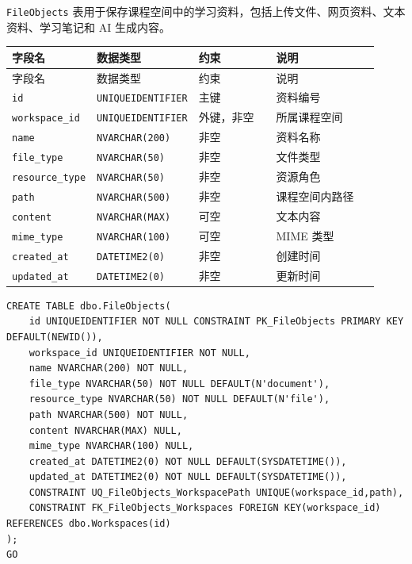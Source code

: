 \documentclass[10pt,a4paper,fontset=none]{ctexart}
\begin{document}
\texttt{FileObjects} 表用于保存课程空间中的学习资料，包括上传文件、网页资料、文本资料、学习笔记和 AI 生成内容。\par

\begingroup\scriptsize
\renewcommand{\arraystretch}{1.18}
\setlength{\LTleft}{0pt}
\setlength{\LTright}{0pt}
\begin{longtable}{>{\raggedright\arraybackslash}p{0.20\linewidth}>{\raggedright\arraybackslash}p{0.16\linewidth}>{\raggedright\arraybackslash}p{0.24\linewidth}>{\raggedright\arraybackslash}p{0.32\linewidth}}
\toprule
字段名 & 数据类型 & 约束 & 说明 \\
\midrule
\endfirsthead
\toprule
字段名 & 数据类型 & 约束 & 说明 \\
\midrule
\endhead
\texttt{id} & \texttt{UNIQUEIDENTIFIER} & 主键 & 资料编号 \\
\texttt{workspace\_id} & \texttt{UNIQUEIDENTIFIER} & 外键，非空 & 所属课程空间 \\
\texttt{name} & \texttt{NVARCHAR(200)} & 非空 & 资料名称 \\
\texttt{file\_type} & \texttt{NVARCHAR(50)} & 非空 & 文件类型 \\
\texttt{resource\_type} & \texttt{NVARCHAR(50)} & 非空 & 资源角色 \\
\texttt{path} & \texttt{NVARCHAR(500)} & 非空 & 课程空间内路径 \\
\texttt{content} & \texttt{NVARCHAR(MAX)} & 可空 & 文本内容 \\
\texttt{mime\_type} & \texttt{NVARCHAR(100)} & 可空 & MIME 类型 \\
\texttt{created\_at} & \texttt{DATETIME2(0)} & 非空 & 创建时间 \\
\texttt{updated\_at} & \texttt{DATETIME2(0)} & 非空 & 更新时间 \\
\bottomrule
\end{longtable}
\endgroup


\begin{Verbatim}[fontsize=\scriptsize,frame=single]
CREATE TABLE dbo.FileObjects(
    id UNIQUEIDENTIFIER NOT NULL CONSTRAINT PK_FileObjects PRIMARY KEY DEFAULT(NEWID()),
    workspace_id UNIQUEIDENTIFIER NOT NULL,
    name NVARCHAR(200) NOT NULL,
    file_type NVARCHAR(50) NOT NULL DEFAULT(N'document'),
    resource_type NVARCHAR(50) NOT NULL DEFAULT(N'file'),
    path NVARCHAR(500) NOT NULL,
    content NVARCHAR(MAX) NULL,
    mime_type NVARCHAR(100) NULL,
    created_at DATETIME2(0) NOT NULL DEFAULT(SYSDATETIME()),
    updated_at DATETIME2(0) NOT NULL DEFAULT(SYSDATETIME()),
    CONSTRAINT UQ_FileObjects_WorkspacePath UNIQUE(workspace_id,path),
    CONSTRAINT FK_FileObjects_Workspaces FOREIGN KEY(workspace_id) REFERENCES dbo.Workspaces(id)
);
GO
\end{Verbatim}
\end{document}
